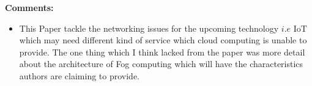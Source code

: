 \documentclass[a4paper,12pt, twoside]{article}
\begin{document}
\textbf{Comments:}
\begin{itemize}
	\item This Paper tackle the networking issues for the upcoming technology $i.e$ IoT which may need different kind of service which cloud computing is unable to provide. The one thing which I think lacked from the paper was more detail about the architecture of Fog computing which will have the characteristics authors are claiming to provide.    
\end{itemize}
\end{document}

